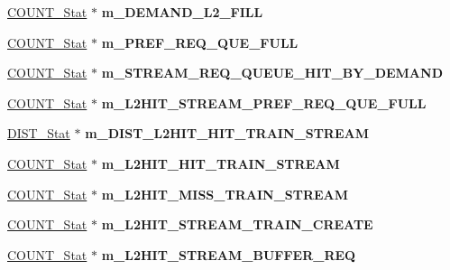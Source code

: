 \begin{DoxyCompactItemize}
\item 
\hypertarget{classall__stats__c_a9d7d482876f05b9734882b02fbfba6f9}{
\hyperlink{classCOUNT__Stat}{COUNT\_\-Stat} $\ast$ {\bfseries m\_\-DEMAND\_\-L2\_\-FILL}}
\label{classall__stats__c_a9d7d482876f05b9734882b02fbfba6f9}

\item 
\hypertarget{classall__stats__c_a842ee5ddb375f76ff0be6a7d843ece92}{
\hyperlink{classCOUNT__Stat}{COUNT\_\-Stat} $\ast$ {\bfseries m\_\-PREF\_\-REQ\_\-QUE\_\-FULL}}
\label{classall__stats__c_a842ee5ddb375f76ff0be6a7d843ece92}

\item 
\hypertarget{classall__stats__c_a4c89fc7127e74de6ac49a65e12afbe2b}{
\hyperlink{classCOUNT__Stat}{COUNT\_\-Stat} $\ast$ {\bfseries m\_\-STREAM\_\-REQ\_\-QUEUE\_\-HIT\_\-BY\_\-DEMAND}}
\label{classall__stats__c_a4c89fc7127e74de6ac49a65e12afbe2b}

\item 
\hypertarget{classall__stats__c_a165dfd46e194589d9b411ab8b0a3962a}{
\hyperlink{classCOUNT__Stat}{COUNT\_\-Stat} $\ast$ {\bfseries m\_\-L2HIT\_\-STREAM\_\-PREF\_\-REQ\_\-QUE\_\-FULL}}
\label{classall__stats__c_a165dfd46e194589d9b411ab8b0a3962a}

\item 
\hypertarget{classall__stats__c_a51212a4be6a3505e35a44fb3c2f81485}{
\hyperlink{classDIST__Stat}{DIST\_\-Stat} $\ast$ {\bfseries m\_\-DIST\_\-L2HIT\_\-HIT\_\-TRAIN\_\-STREAM}}
\label{classall__stats__c_a51212a4be6a3505e35a44fb3c2f81485}

\item 
\hypertarget{classall__stats__c_a1d6ad56888b1c01a85793480ce358816}{
\hyperlink{classCOUNT__Stat}{COUNT\_\-Stat} $\ast$ {\bfseries m\_\-L2HIT\_\-HIT\_\-TRAIN\_\-STREAM}}
\label{classall__stats__c_a1d6ad56888b1c01a85793480ce358816}

\item 
\hypertarget{classall__stats__c_ac6cdae698b8916206966ef0c8200d7b2}{
\hyperlink{classCOUNT__Stat}{COUNT\_\-Stat} $\ast$ {\bfseries m\_\-L2HIT\_\-MISS\_\-TRAIN\_\-STREAM}}
\label{classall__stats__c_ac6cdae698b8916206966ef0c8200d7b2}

\item 
\hypertarget{classall__stats__c_ae0b02d4ed4beeae4a60a707289abf68b}{
\hyperlink{classCOUNT__Stat}{COUNT\_\-Stat} $\ast$ {\bfseries m\_\-L2HIT\_\-STREAM\_\-TRAIN\_\-CREATE}}
\label{classall__stats__c_ae0b02d4ed4beeae4a60a707289abf68b}

\item 
\hypertarget{classall__stats__c_ad3489feee38578d504ec5b597bec7804}{
\hyperlink{classCOUNT__Stat}{COUNT\_\-Stat} $\ast$ {\bfseries m\_\-L2HIT\_\-STREAM\_\-BUFFER\_\-REQ}}
\label{classall__stats__c_ad3489feee38578d504ec5b597bec7804}


\end{DoxyCompactItemize}

